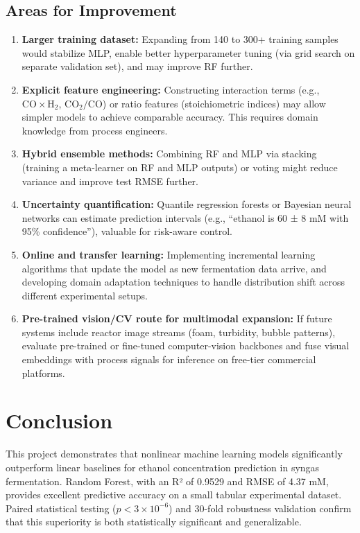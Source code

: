 \documentclass[conference]{IEEEtran}
\begin{document}
\subsection{Areas for Improvement}
\begin{enumerate}
\item \textbf{Larger training dataset:} Expanding from 140 to 300+ training samples would stabilize MLP, enable better hyperparameter tuning (via grid search on separate validation set), and may improve RF further.
\item \textbf{Explicit feature engineering:} Constructing interaction terms (e.g., $\text{CO} \times \text{H}_2$, $\text{CO}_2 / \text{CO}$) or ratio features (stoichiometric indices) may allow simpler models to achieve comparable accuracy. This requires domain knowledge from process engineers.
\item \textbf{Hybrid ensemble methods:} Combining RF and MLP via stacking (training a meta-learner on RF and MLP outputs) or voting might reduce variance and improve test RMSE further.
\item \textbf{Uncertainty quantification:} Quantile regression forests or Bayesian neural networks can estimate prediction intervals (e.g., ``ethanol is 60 ± 8 mM with 95\% confidence''), valuable for risk-aware control.
\item \textbf{Online and transfer learning:} Implementing incremental learning algorithms that update the model as new fermentation data arrive, and developing domain adaptation techniques to handle distribution shift across different experimental setups.
\item \textbf{Pre-trained vision/CV route for multimodal expansion:} If future systems include reactor image streams (foam, turbidity, bubble patterns), evaluate pre-trained or fine-tuned computer-vision backbones and fuse visual embeddings with process signals for inference on free-tier commercial platforms.
\end{enumerate}

\section{Conclusion}

This project demonstrates that nonlinear machine learning models significantly outperform linear baselines for ethanol concentration prediction in syngas fermentation. Random Forest, with an R² of 0.9529 and RMSE of 4.37 mM, provides excellent predictive accuracy on a small tabular experimental dataset. Paired statistical testing ($p < 3 \times 10^{-6}$) and 30-fold robustness validation confirm that this superiority is both statistically significant and generalizable.
\end{document}
